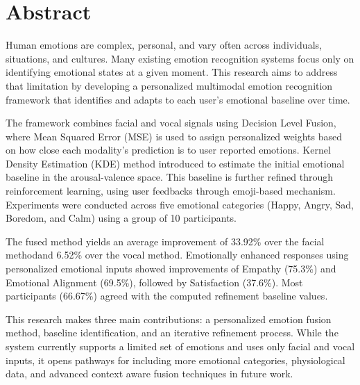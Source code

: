 \chapter*{Abstract}


    Human emotions are complex, personal, and vary often across individuals, situations, and cultures. Many existing emotion recognition systems focus only on identifying emotional states at a given moment. This research aims to address that limitation by developing a personalized multimodal emotion recognition framework that identifies and adapts to each user’s emotional baseline over time. 
    
    The framework combines facial and vocal signals using Decision Level Fusion, where Mean Squared Error (MSE) is used to assign personalized weights based on how close each modality's prediction is to user reported emotions. Kernel Density Estimation (KDE) method introduced to estimate the initial emotional baseline in the arousal-valence space. This baseline is further refined through reinforcement learning, using user feedbacks through emoji-based mechanism. Experiments were conducted across five emotional categories (Happy, Angry, Sad, Boredom, and Calm) using a group of 10 participants.
    
    The fused method yields an average improvement of 33.92\% over the facial methodand 6.52\% over the vocal method. Emotionally enhanced responses using personalized emotional inputs showed improvements of Empathy (75.3\%) and Emotional Alignment (69.5\%), followed by Satisfaction (37.6\%). Most participants (66.67\%) agreed with the computed refinement baseline values. 

    This research makes three main contributions: a personalized emotion fusion method, baseline identification, and an iterative refinement process. While the system currently supports a limited set of emotions and uses only facial and vocal inputs, it opens pathways for including more emotional categories, physiological data, and advanced context aware fusion techniques in future work.
    
    